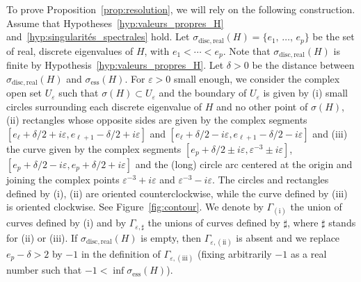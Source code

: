\documentclass[10pt]{amsart}
\theoremstyle{definition}\newtheorem{defi}[theo]{Definition}\newtheorem{rema}[theo]{Remark}\newtheorem{exam}[theo]{Example}\newtheorem{exem}[theo]{Example}\newtheorem{nota}[theo]{Notation}
\newcommand{\ess}{\mathrm{ess}}
\newcommand{\disc}{\mathrm{disc}}
\begin{document}
To prove Proposition~\ref{prop:resolution}, we will rely on the following construction. Assume that Hypotheses~\ref{hyp:valeurs_propres_H} and~\ref{hyp:singularités_spectrales} hold. Let $\sigma_{\disc,\mathrm{real}}(H)=\{e_1,\,\dots,\,e_p\}$ be the set of real, discrete eigenvalues of $H$, with $e_1<\cdots<e_p$. Note that $\sigma_{\disc,\mathrm{real}}(H)$ is finite by Hypothesis~\ref{hyp:valeurs_propres_H}. Let $\delta>0$ be the distance between $\sigma_{\disc,\mathrm{real}}(H)$ and $\sigma_{\ess}(H)$. For $\varepsilon>0$ small enough, we consider the complex open set $U_\varepsilon$ such that $\sigma(H)\subset U_\varepsilon$ and the boundary of $U_\varepsilon$ is given by (i) small circles surrounding each discrete eigenvalue of $H$ and no other point of $\sigma(H)$, (ii) rectangles whose opposite sides are given by the complex segments $[e_\ell + \delta/2 + i\varepsilon, e_{\ell+1}-\delta/2 + i\varepsilon]$ and $[e_\ell + \delta/2 - i\varepsilon, e_{\ell+1}-\delta/2 - i\varepsilon]$ and (iii) the curve given by the complex segments $[e_p+\delta/2\pm i\varepsilon,\varepsilon^{-3}\pm i\varepsilon]$, $[e_p+\delta/2-i\varepsilon,e_p+\delta/2+i\varepsilon]$ and the (long) circle arc centered at the origin and joining the complex points $\varepsilon^{-3}+ i\varepsilon$ and $\varepsilon^{-3}- i\varepsilon$. The circles and rectangles defined by (i), (ii) are oriented counterclockwise, while the curve defined by (iii) is oriented clockwise. See Figure~\ref{fig:contour}. We denote by $\Gamma_{\mathrm{(i)}}$ the union of curves defined by (i) and by $\Gamma_{\varepsilon,\sharp}$ the unions of curves defined by $\sharp$, where $\sharp$ stands for (ii) or (iii). If $\sigma_{\disc,\mathrm{real}}(H)$ is empty, then $\Gamma_{\varepsilon,\mathrm{(ii)}}$ is absent and we replace $e_p-\delta>2$ by $-1$ in the definition of $\Gamma_{\varepsilon,\mathrm{(iii)}}$ (fixing arbitrarily $-1$ as a real number such that $-1<\inf\sigma_{\ess}(H)$).
\end{document}
